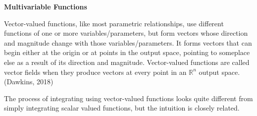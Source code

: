 \documentclass[11pt]{article}
\newcommand{\ihat}{\boldsymbol{\hat{\textbf{\i}}}}
\newcommand{\jhat}{\boldsymbol{\hat{\textbf{\j}}}}
\begin{document}
{\centering{}\textbf{Multivariable Functions}

}

%


%


Vector-valued functions, like most parametric relationships, use different functions of one or more variables/parameters, but form vectors whose direction and magnitude change with those variables/parameters. It forms vectors that can begin either at the origin or at points in the output space, pointing to someplace else as a result of its direction and magnitude. Vector-valued functions are called vector fields when they produce vectors at every point in an $\mathbb{R}^n$ output space. (Dawkins, 2018)


The process of integrating using vector-valued functions looks quite different from simply integrating scalar valued functions, but the intuition is closely related.
\end{document}

